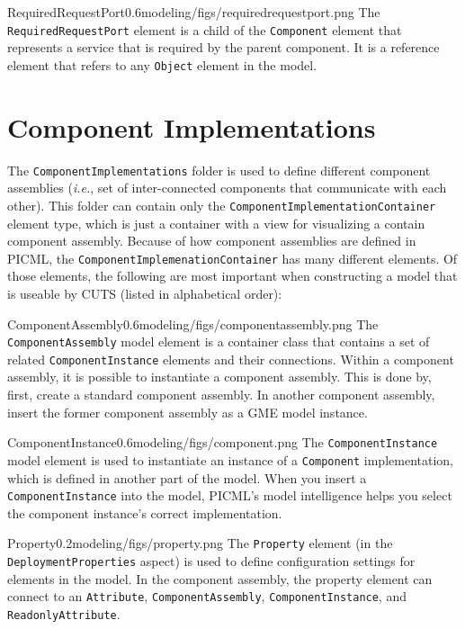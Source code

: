 \begin{modelelement}{RequiredRequestPort}{0.6}{modeling/figs/requiredrequestport.png}
The \texttt{RequiredRequestPort} element is a child of the \texttt{Component}
element that represents a service that is required by the parent component.
It is a reference element that refers to any \texttt{Object} element in
the model.
\end{modelelement}

\section{Component Implementations}

The \texttt{ComponentImplementations} folder is used to define 
different component assemblies (\textit{i.e.}, set of inter-connected
components that communicate with each other).
This folder can contain only the \texttt{ComponentImplementationContainer} 
element type, which is just a container with a view for visualizing
a contain component assembly. Because of how component assemblies are
defined in PICML, the \texttt{ComponentImplemenationContainer} has
many different elements. Of those elements, the following are most 
important when constructing a model that is useable by CUTS 
(listed in alphabetical order):

\begin{modelelement}{ComponentAssembly}{0.6}{modeling/figs/componentassembly.png}
The \texttt{ComponentAssembly} model element is a container class that
contains a set of related \texttt{ComponentInstance} elements and their
connections. Within a component assembly, it is possible to instantiate
a component assembly. This is done by, first, create a standard component
assembly. In another component assembly, insert the former component 
assembly as a GME model instance.
\end{modelelement}

\begin{modelelement}{ComponentInstance}{0.6}{modeling/figs/component.png}
The \texttt{ComponentInstance} model element is used to instantiate an
instance of a \texttt{Component} implementation, which is defined in another
part of the model. When you insert a \texttt{ComponentInstance} into the
model, PICML's model intelligence helps you select the component instance's
correct implementation.
\end{modelelement}

\begin{modelelement}{Property}{0.2}{modeling/figs/property.png}
The \texttt{Property} element (in the \texttt{DeploymentProperties}
aspect) is used to define configuration
settings for elements in the model. In the component assembly, the
property element can connect to an \texttt{Attribute}, 
\texttt{ComponentAssembly}, \texttt{ComponentInstance}, and
\texttt{ReadonlyAttribute}.
\end{modelelement}

